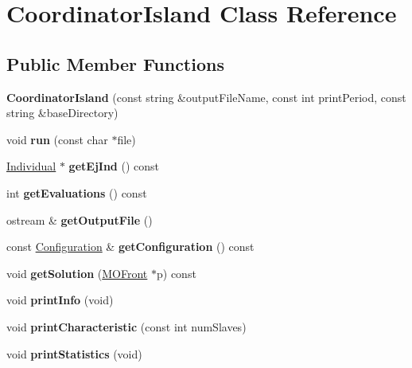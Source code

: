 \hypertarget{classCoordinatorIsland}{}\section{Coordinator\+Island Class Reference}
\label{classCoordinatorIsland}
\subsection*{Public Member Functions}
\begin{DoxyCompactItemize}
\item 
\mbox{\label{classCoordinatorIsland_ab06731bdeed215595beebce0f087d967}} 
{\bfseries Coordinator\+Island} (const string \&output\+File\+Name, const int print\+Period, const string \&base\+Directory)
\item 
\mbox{\label{classCoordinatorIsland_aec9d72018c3681483e02da3b1aca90a9}} 
void {\bfseries run} (const char $\ast$file)
\item 
\mbox{\label{classCoordinatorIsland_aa811da3292d8a8ee8c2b9041bea1cd2f}} 
\mbox{\hyperlink{classIndividual}{Individual}} $\ast$ {\bfseries get\+Ej\+Ind} () const
\item 
\mbox{\label{classCoordinatorIsland_a1f2f4cbc23e2e571f25b2684a2cdc356}} 
int {\bfseries get\+Evaluations} () const
\item 
\mbox{\label{classCoordinatorIsland_a979a3b6fc598652fb50479a069f3a08c}} 
ostream \& {\bfseries get\+Output\+File} ()
\item 
\mbox{\label{classCoordinatorIsland_aaceb2bd1c34696257a6599d8671e126c}} 
const \mbox{\hyperlink{classConfiguration}{Configuration}} \& {\bfseries get\+Configuration} () const
\item 
\mbox{\label{classCoordinatorIsland_a4a2824a1972075f41e2dcac9ea4bd6be}} 
void {\bfseries get\+Solution} (\mbox{\hyperlink{classMOFront}{M\+O\+Front}} $\ast$p) const
\item 
\mbox{\label{classCoordinatorIsland_a56f3dbd38c55b9363cad706228c588a2}} 
void {\bfseries print\+Info} (void)
\item 
\mbox{\label{classCoordinatorIsland_afaadf2f86c49888e4194bbebdb96aa4d}} 
void {\bfseries print\+Characteristic} (const int num\+Slaves)
\item 
\mbox{\label{classCoordinatorIsland_ad6f09de501f6ed21c6d7fce73937c4af}} 
void {\bfseries print\+Statistics} (void)
\end{DoxyCompactItemize}
